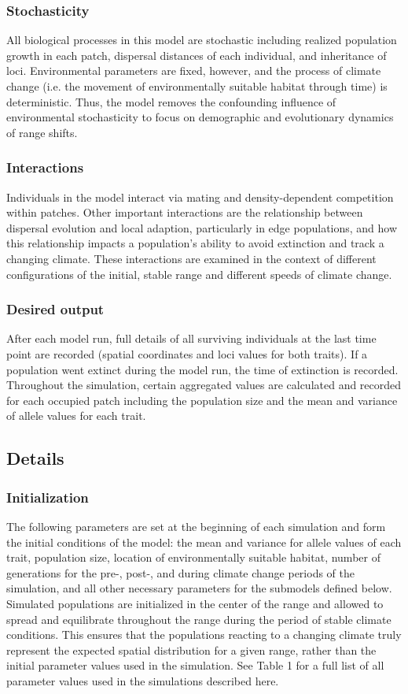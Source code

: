 \documentclass[11pt, oneside]{article}
\begin{document}
\subsubsection{Stochasticity}
All biological processes in this model are stochastic including realized population growth in each patch, dispersal distances of each individual, and inheritance of loci. Environmental parameters are fixed, however, and the process of climate change (i.e. the movement of environmentally suitable habitat through time) is deterministic. Thus, the model removes the confounding influence of environmental stochasticity to focus on demographic and evolutionary dynamics of range shifts.

\subsubsection{Interactions}
Individuals in the model interact via mating and density-dependent competition within patches. Other important interactions are the relationship between dispersal evolution and local adaption, particularly in edge populations, and how this relationship impacts a population's ability to avoid extinction and track a changing climate. These interactions are examined in the context of different configurations of the initial, stable range and different speeds of climate change.

\subsubsection{Desired output}
After each model run, full details of all surviving individuals at the last time point are recorded (spatial coordinates and loci values for both traits). If a population went extinct during the model run, the time of extinction is recorded. Throughout the simulation, certain aggregated values are calculated and recorded for each occupied patch including the population size and the mean and variance of allele values for each trait. 

\subsection{Details}
\subsubsection{Initialization}
The following parameters are set at the beginning of each simulation and form the initial conditions of the model: the mean and variance for allele values of each trait, population size, location of environmentally suitable habitat, number of generations for the pre-, post-, and during climate change periods of the simulation, and all other necessary parameters for the submodels defined below. Simulated populations are initialized in the center of the range and allowed to spread and equilibrate throughout the range during the period of stable climate conditions. This ensures that the populations reacting to a changing climate truly represent the expected spatial distribution for a given range, rather than the initial parameter values used in the simulation. See Table 1 for a full list of all parameter values used in the simulations described here.
\end{document}
